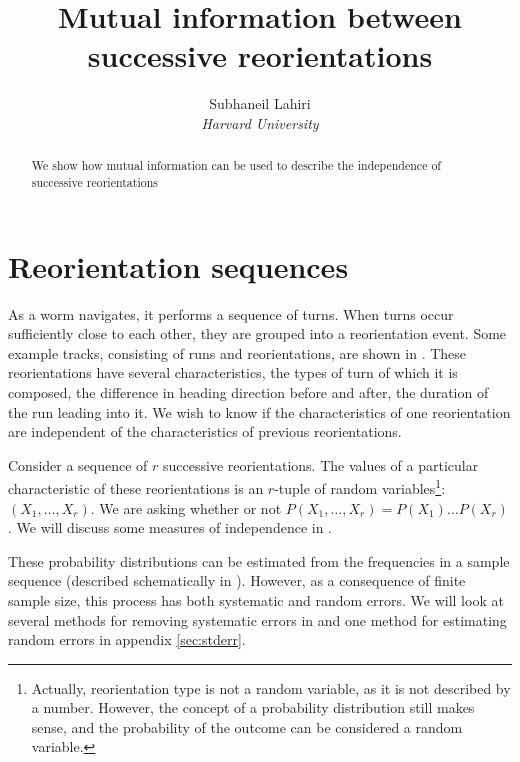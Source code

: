 \documentclass[12pt]{article}
\title{Mutual information between successive reorientations}
\author{Subhaneil Lahiri
\\
%
%
\small{\emph{Harvard University}}
%
}
\begin{document}
\maketitle





\begin{abstract}
  We show how mutual information can be used to describe the independence of successive reorientations
\end{abstract}

\tableofcontents


\section{Reorientation sequences}\label{sec:reoseq}

As a worm navigates, it performs a sequence of turns. When turns occur sufficiently close to each other, they are grouped into a reorientation event. Some example tracks, consisting of runs and reorientations, are shown in . These reorientations have several characteristics, \eg the types of turn of which it is composed, the difference in heading direction before and after, the duration of the run leading into it. We wish to know if the characteristics of one reorientation are independent of the characteristics of previous reorientations.

Consider a sequence of $r$ successive reorientations. The values of a particular characteristic of these reorientations is an $r$-tuple of random variables\footnote{ Actually, reorientation type is not a random variable, as it is not described by a number. However, the concept of a probability distribution still makes sense, and the probability of the outcome can be considered a random variable. }: $(X_1,\ldots,X_r)$. We are asking whether or not $P(X_1,\ldots,X_r) = P(X_1)\ldots P(X_r)$. We will discuss some measures of independence in .

These probability distributions can be estimated from the frequencies in a sample sequence (described schematically in ). However, as a consequence of finite sample size, this process has both systematic and random errors. We will look at several methods for removing systematic errors in  and one method for estimating random errors in appendix \ref{sec:stderr}.
\end{document}
